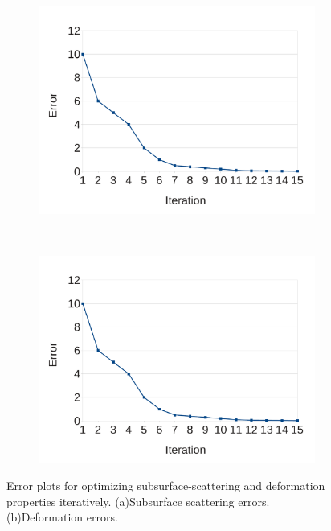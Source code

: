 \documentclass[annual]{acmsiggraph}
\begin{document}
\begin{figure}
\begin{subfigure}[b]{0.3\textwidth}
	\centering
 	\includegraphics[width=\textwidth]{figure/error.pdf}
   	\caption{}
    \label{fig:ssErr}
    \end{subfigure}
    ~ 
    \begin{subfigure}[b]{0.3\textwidth}
    \centering
  	\includegraphics[width=\textwidth]{figure/error.pdf}
    \caption{}
    \label{fig:deformErr}
\end{subfigure}
\caption{Error plots for 
optimizing subsurface-scattering and deformation properties 
iteratively. (a)Subsurface scattering errors. (b)Deformation errors.}
\label{fig:err}
\end{figure}
\end{document}
